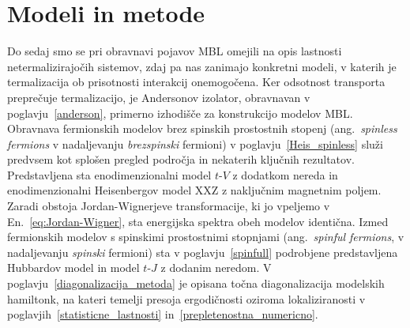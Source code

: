 
\chapter{Modeli in metode}\label{modelimetode}
Do sedaj smo se pri obravnavi pojavov MBL omejili na opis lastnosti netermalizirajočih sistemov, zdaj pa nas zanimajo konkretni modeli, v katerih je termalizacija ob prisotnosti interakcij onemogočena. Ker odsotnost transporta preprečuje termalizacijo, je Andersonov izolator, obravnavan v poglavju~\ref{anderson}, primerno izhodišče za konstrukcijo modelov MBL. Obravnava fermionskih modelov brez spinskih prostostnih stopenj (ang.~\emph{spinless fermions} v nadaljevanju \emph{brezspinski} fermioni) v poglavju~\ref{Heis_spinless} služi predvsem kot splošen pregled področja in nekaterih ključnih rezultatov. Predstavljena sta enodimenzionalni model $t$-$V$ z dodatkom nereda in enodimenzionalni Heisenbergov model XXZ z naključnim magnetnim poljem. Zaradi obstoja Jordan-Wignerjeve transformacije, ki jo vpeljemo v En.~\eqref{eq:Jordan-Wigner}, sta energijska spektra obeh modelov identična. 
Izmed fermionskih modelov s spinskimi prostostnimi stopnjami (ang.~\emph{spinful fermions}, v nadaljevanju \emph{spinski} fermioni) sta v poglavju~\ref{spinfull} podrobjene predstavljena Hubbardov model in model $t$-$J$ z dodanim neredom. 
V poglavju~\ref{diagonalizacija_metoda} je opisana točna diagonalizacija modelskih hamiltonk, na kateri temelji presoja ergodičnosti oziroma lokaliziranosti v poglavjih~\ref{statisticne_lastnosti} in~\ref{prepletenostna_numericno}.
